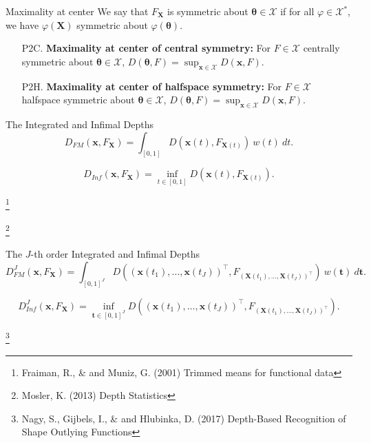 \documentclass[handout, notes]{beamer}
\newcommand{\vx}{\bm{x}}
\newcommand{\vX}{\bm{X}}
\newcommand{\vth}{\bm{\theta}}
\newcommand\blfootnote[1]{%
  \begingroup
  \renewcommand\thefootnote{}\footnote{#1}%
  \addtocounter{footnote}{-1}%
  \endgroup
}
\begin{document}
    \begin{frame}{Maximality at center}
        We say that $F_{\vX}$ is symmetric about $\vth \in \mathscr{X}$ if for
        all $\varphi \in \mathscr{X}^*$, we have $\varphi(\vX)$ symmetric
        about $\varphi(\vth)$.

        \begin{enumerate}
            \item[P2C.] \textbf{Maximality at center of central symmetry:} For
            $F \in \mathscr{X}$ centrally symmetric about $\vth \in
            \mathscr{X}$, $D(\vth, F) = \sup_{\vx \in \mathscr{X}} D(\vx, F)$.

            \item[P2H.] \textbf{Maximality at center of halfspace symmetry:} For
            $F \in \mathscr{X}$ halfspace symmetric about $\vth \in
            \mathscr{X}$, $D(\vth, F) = \sup_{\vx \in \mathscr{X}} D(\vx, F)$.
        \end{enumerate}
    \end{frame}

    \begin{frame}{The Integrated and Infimal Depths}
        \[
            D_{FM}(\vx, F_{\vX}) = \int_{[0, 1]} D(\vx(t), F_{\vX(t)})\:w(t)\:dt.
        \]

        \[
            D_{Inf}(\vx, F_{\vX}) = \inf_{t \in [0, 1]} D(\vx(t), F_{\vX(t)}).
        \]

        \blfootnote{
            Fraiman, R., \& and Muniz, G. (2001) Trimmed means for functional
            data
        }
        \blfootnote{
            Mosler, K. (2013) Depth Statistics
        }
    \end{frame}

    \begin{frame}{The $J$-th order Integrated and Infimal Depths}
        \[
            D_{FM}^J(\vx, F_{\vX}) = \int_{[0, 1]^J} D((\vx(t_1), \dots, \vx(t_J))^\top, F_{(\vX(t_1), \dots, \vX(t_J))^\top})\:w(\bm{t})\:d\bm{t}.
        \]

        \[
            D_{Inf}^J(\vx, F_{\vX}) = \inf_{\bm{t} \in [0, 1]^J} D((\vx(t_1), \dots, \vx(t_J))^\top, F_{(\vX(t_1), \dots, \vX(t_J))^\top}).
        \]

        \blfootnote{
            Nagy, S., Gijbels, I., \& and Hlubinka, D. (2017) Depth-Based
            Recognition of Shape Outlying Functions
        }
    \end{frame}

\end{document}
